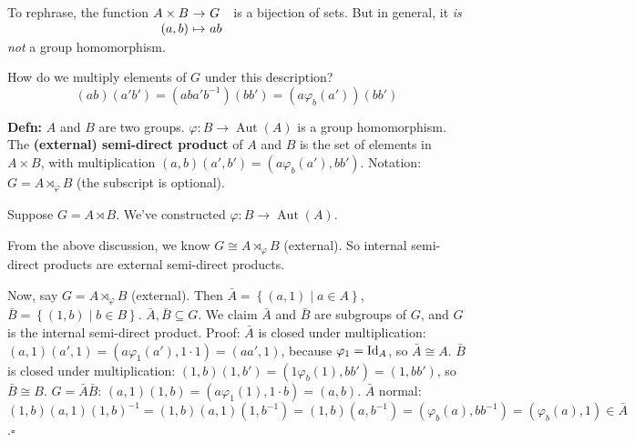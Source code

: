 \documentclass[10pt,letterpaper]{article}
\newcommand{\n}{\hfill\break}
\newcommand{\hangblock}[2]{\par\noindent\settowidth{\hangindent}{\textbf{#1: }}\textbf{#1: }\!\!\!#2}
\newcommand{\defn}[1]{\hangblock{Defn}{#1}}
\newcommand{\proven}{\;$\square$\n}
\newcommand{\set}[1]{\left\{#1\right\}}
\newcommand{\inv}{^{-1}}
\newcommand{\map}[4]{\!\!\!\begin{array}[t]{rcl}#1 & \!\!\!\!\to & \!\!\!\!#2\\ #3 & \!\!\!\!\mapsto & \!\!\!\!#4\end{array}}
\newcommand{\Id}{\textrm{\textnormal{Id}}}
\DeclareMathOperator{\Aut}{Aut}
\begin{document}
\par\noindent
To rephrase, the function $\map{A\times{}B}{G}{(a,b)}{ab}$ is a bijection of sets. But in general, it \textit{is not} a group homomorphism.\n

\par\noindent
How do we multiply elements of $G$ under this description?
\[
	(ab)(a'b')=(aba'b\inv)(bb')=(a\varphi_{b}(a'))(bb')
\]

\defn{
	$A$ and $B$ are two groups. $\varphi:B\to\Aut(A)$ is a group homomorphism. The \textbf{(external) semi-direct product} of $A$ and $B$ is the set of elements in $A\times{}B$, with multiplication\n
	$(a,b)(a',b')=(a\varphi_{b}(a'),bb')$. Notation: $G=A\rtimes_{\varphi}B$ (the subscript is optional).\n
}

\par\noindent
Suppose $G=A\rtimes{}B$. We've constructed $\varphi:B\to\Aut(A)$.\n

\par\noindent
From the above discussion, we know $G\cong{}A\rtimes_{\varphi}B$ (external). So internal semi-direct products are external semi-direct products.\n

\par\noindent
Now, say $G=A\rtimes_{\varphi}B$ (external). Then $\bar{A}=\set{(a,1)\mid{}a\in{}A}$, $\bar{B}=\set{(1,b)\mid{}b\in{}B}$. $\bar{A},\bar{B}\subseteq{}G$. We claim $\bar{A}$ and $\bar{B}$ are subgroups of $G$, and $G$ is the internal semi-direct product.\n
Proof:\n
$\bar{A}$ is closed under multiplication: $(a,1)(a',1)=(a\varphi_{1}(a'),1\cdot{}1)=(aa',1)$, because $\varphi_{1}=\Id_{A}$, so $\bar{A}\cong{}A$.\n
$\bar{B}$ is closed under multiplication: $(1,b)(1,b')=(1\varphi_{b}(1),bb')=(1,bb')$, so $\bar{B}\cong{}B$.\n
$G=\bar{A}\bar{B}$: $(a,1)(1,b)=(a\varphi_{1}(1),1\cdot{}b)=(a,b)$.\n
$\bar{A}$ normal: $(1,b)(a,1)(1,b)\inv=(1,b)(a,1)(1,b\inv)=(1,b)(a,b\inv)=(\varphi_{b}(a),bb\inv)=(\varphi_{b}(a),1)\in\bar{A}$.\proven
\end{document}
